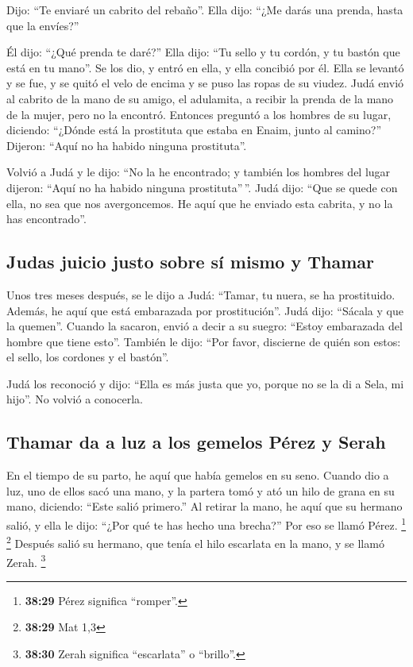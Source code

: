  Dijo: ``Te enviaré un cabrito del rebaño''. Ella dijo:
``¿Me darás una prenda, hasta que la envíes?''

 Él dijo: ``¿Qué prenda te daré?'' Ella dijo: ``Tu sello
y tu cordón, y tu bastón que está en tu mano''. Se los dio, y entró en
ella, y ella concibió por él.  Ella se levantó y se fue,
y se quitó el velo de encima y se puso las ropas de su viudez.
 Judá envió al cabrito de la mano de su amigo, el
adulamita, a recibir la prenda de la mano de la mujer, pero no la
encontró.  Entonces preguntó a los hombres de su lugar,
diciendo: ``¿Dónde está la prostituta que estaba en Enaim, junto al
camino?'' Dijeron: ``Aquí no ha habido ninguna prostituta''.

 Volvió a Judá y le dijo: ``No la he encontrado; y
también los hombres del lugar dijeron: ``Aquí no ha habido ninguna
prostituta''\,''.  Judá dijo: ``Que se quede con ella, no
sea que nos avergoncemos. He aquí que he enviado esta cabrita, y no la
has encontrado''.

\hypertarget{judas-juicio-justo-sobre-suxed-mismo-y-thamar}{%
\subsection{Judas juicio justo sobre sí mismo y
Thamar}\label{judas-juicio-justo-sobre-suxed-mismo-y-thamar}}

 Unos tres meses después, se le dijo a Judá: ``Tamar, tu
nuera, se ha prostituido. Además, he aquí que está embarazada por
prostitución''. Judá dijo: ``Sácala y que la quemen''. 
Cuando la sacaron, envió a decir a su suegro: ``Estoy embarazada del
hombre que tiene esto''. También le dijo: ``Por favor, discierne de
quién son estos: el sello, los cordones y el bastón''.

 Judá los reconoció y dijo: ``Ella es más justa que yo,
porque no se la di a Sela, mi hijo''. No volvió a conocerla.

\hypertarget{thamar-da-a-luz-a-los-gemelos-puxe9rez-y-serah}{%
\subsection{Thamar da a luz a los gemelos Pérez y
Serah}\label{thamar-da-a-luz-a-los-gemelos-puxe9rez-y-serah}}

 En el tiempo de su parto, he aquí que había gemelos en
su seno.  Cuando dio a luz, uno de ellos sacó una mano, y
la partera tomó y ató un hilo de grana en su mano, diciendo: ``Este
salió primero.''  Al retirar la mano, he aquí que su
hermano salió, y ella le dijo: ``¿Por qué te has hecho una brecha?'' Por
eso se llamó Pérez. \footnote{\textbf{38:29} Pérez significa ``romper''.}
\footnote{\textbf{38:29} Mat 1,3}  Después salió su
hermano, que tenía el hilo escarlata en la mano, y se llamó Zerah.
\footnote{\textbf{38:30} Zerah significa ``escarlata'' o ``brillo''.}

